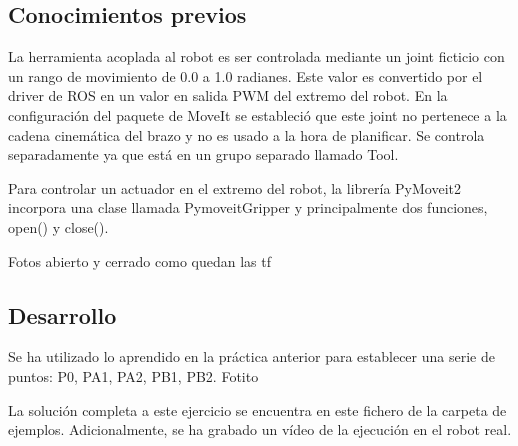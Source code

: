 \subsection*{Conocimientos previos}
La herramienta acoplada al robot es ser controlada mediante un joint ficticio con un rango de movimiento de 0.0 a 1.0 radianes. Este 
valor es convertido por el driver de ROS en un valor en salida PWM del extremo del robot. En la configuración del paquete de MoveIt se 
estableció que este joint no pertenece a la cadena cinemática del brazo y no es usado a la hora de planificar. Se controla separadamente 
ya que está en un grupo separado llamado Tool.

Para controlar un actuador en el extremo del robot, la librería PyMoveit2 incorpora una clase llamada PymoveitGripper y principalmente dos 
funciones, open() y close().




Fotos abierto y cerrado como quedan las tf


\subsection*{Desarrollo}
Se ha utilizado lo aprendido en la práctica anterior para establecer una serie de puntos: P0, PA1, PA2, PB1, PB2.
Fotito


La solución completa a este ejercicio se encuentra en este fichero de la carpeta de ejemplos. Adicionalmente, se ha grabado un vídeo de 
la ejecución en el robot real.